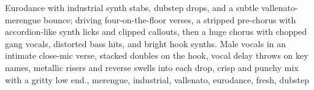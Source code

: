 

\begin{notes}
\end{notes}
\begin{style}
Eurodance with industrial synth stabs, dubstep drops, and a subtle vallenato-merengue bounce; driving four-on-the-floor verses, a stripped pre-chorus with accordion-like synth licks and clipped callouts, then a huge chorus with chopped gang vocals, distorted bass hits, and bright hook synths. %
Male vocals in an intimate close-mic verse, stacked doubles on the hook, vocal delay throws on key names, metallic risers and reverse swells into each drop, crisp and punchy mix with a gritty low end., merengue, industrial, vallenato, eurodance, fresh, dubstep
\end{style}
